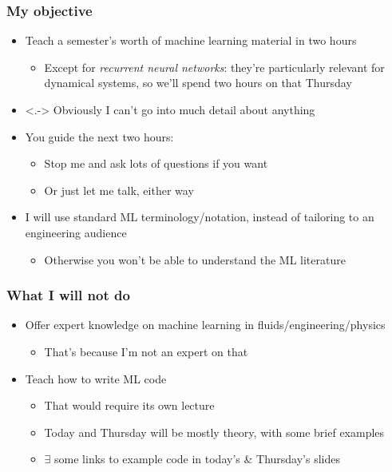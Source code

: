 \begin{frame}
    \frametitle{My objective}

    \begin{itemize}
        \item<+-> Teach a semester's worth of machine learning material in two hours
        \begin{itemize}
            \item Except for \emph{recurrent neural networks}: they're particularly relevant for dynamical systems, so we'll spend two hours on that Thursday
        \end{itemize}
        \item<.-> Obviously I can't go into much detail about anything
        \item<+-> You guide the next two hours:
        \begin{itemize}
            \item Stop me and ask lots of questions if you want \smiley
            \item Or just let me talk, either way
        \end{itemize}
        \item<+-> I will use standard ML terminology/notation, instead of tailoring to an engineering audience
        \begin{itemize}
            \item Otherwise you won't be able to understand the ML literature
        \end{itemize}
    \end{itemize}
\end{frame}

\begin{frame}
    \frametitle{What I will not do}
    \begin{itemize}
        \item<+-> Offer expert knowledge on machine learning in fluids/engineering/physics
        \begin{itemize}
            \item That's because I'm not an expert on that
        \end{itemize}
        \item<+-> Teach how to write ML code
        \begin{itemize}
            \item That would require its own lecture
            \item Today and Thursday will be mostly theory, with some brief examples
            \item $\exists$ some links to example code in today's \& Thursday's slides
        \end{itemize}
    \end{itemize}
\end{frame}

